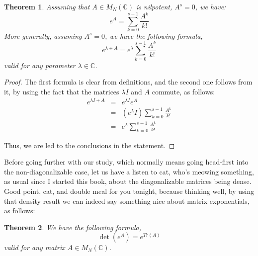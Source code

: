 \documentclass[12pt]{amsbook}
\newtheorem{theorem}{Theorem}[chapter]
\begin{document}
\begin{theorem}
Assuming that $A\in M_N(\mathbb C)$ is nilpotent, $A^s=0$, we have:
$$e^A=\sum_{k=0}^{s-1}\frac{A^k}{k!}$$
More generally, assuming $A^s=0$, we have the following formula,
$$e^{\lambda+A}=e^{\lambda}\sum_{k=0}^{s-1}\frac{A^k}{k!}$$
valid for any parameter $\lambda\in\mathbb C$.
\end{theorem}

\begin{proof}
The first formula is clear from definitions, and the second one follows from it, by using the fact that the matrices $\lambda I$ and $A$ commute, as follows:
\begin{eqnarray*}
e^{\lambda I+A}
&=&e^{\lambda I}e^A\\
&=&(e^\lambda I)\sum_{k=0}^{s-1}\frac{A^k}{k!}\\
&=&e^{\lambda}\sum_{k=0}^{s-1}\frac{A^k}{k!}
\end{eqnarray*}

Thus, we are led to the conclusions in the statement.
\end{proof}

Before going further with our study, which normally means going head-first into the non-diagonalizable case, let us have a listen to cat, who's meowing something, as usual since I started this book, about the diagonalizable matrices being dense. Good point, cat, and double meal for you tonight, because thinking well, by using that density result we can indeed say something nice about matrix exponentials, as follows:

\begin{theorem}
We have the following formula,
$$\det(e^A)=e^{Tr(A)}$$
valid for any matrix $A\in M_N(\mathbb C)$.
\end{theorem}
\end{document}
